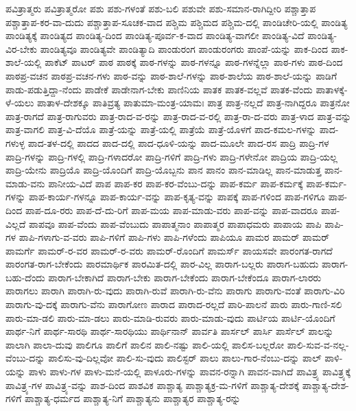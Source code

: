 {ಪವಿತ್ರಾತ್ಮರು
ಪವಿತ್ರಾತ್ಮರೋ
ಪಶು
ಪಶು-ಗಳಂತೆ
ಪಶು-ಬಲಿ
ಪಶುವೇ
ಪಶು-ಸಮಾನ-ರಾಗಿದ್ದೀರಿ
ಪಶ್ಚಾತ್ತಾಪ
ಪಶ್ಚಾತ್ತಾಪ-ಕರ-ವಾ-ದುದು
ಪಶ್ಚಾತ್ತಾಪ-ಸೂಚಕ-ವಾದ
ಪಶ್ಚಿಮ
ಪಶ್ಚಿಮದ
ಪಶ್ಚಿಮ-ದಲ್ಲಿ
ಪಾಂಡಿಚೇರಿ-ಯಲ್ಲಿ
ಪಾಂಡಿತ್ಯ
ಪಾಂಡಿತ್ಯಕ್ಕೆ
ಪಾಂಡಿತ್ಯದ
ಪಾಂಡಿತ್ಯ-ದಿಂದ
ಪಾಂಡಿತ್ಯ-ಪೂರ್ವ-ಕ-ವಾದ
ಪಾಂಡಿತ್ಯ-ವಾಗಲೀ
ಪಾಂಡಿತ್ಯ-ವಿದೆ
ಪಾಂಡಿತ್ಯ-ವಿರ-ಬೇಕು
ಪಾಂಡಿತ್ಯವೂ
ಪಾಂಡಿತ್ಯವೇ
ಪಾಂಡಿತ್ಯಾದಿ
ಪಾಂಡುರಂಗ
ಪಾಂಡುರಂಗರು
ಪಾಂಪೆ-ಯನ್ನು
ಪಾಕ-ದಿಂದ
ಪಾಕ-ಶಾಲೆ-ಯಲ್ಲಿ
ಪಾಕೆಟ್
ಪಾಟರ್
ಪಾಠ
ಪಾಠಕ್ಕೆ
ಪಾಠ-ಗಳನ್ನು
ಪಾಠ-ಗಳನ್ನೂ
ಪಾಠ-ಗಳನ್ನೆಲ್ಲಾ
ಪಾಠ-ಗಳು
ಪಾಠ-ದಿಂದ
ಪಾಠಪ್ರ-ವಚನ
ಪಾಠಪ್ರ-ವಚನ-ಗಳು
ಪಾಠ-ವನ್ನು
ಪಾಠ-ಶಾಲೆ-ಗಳನ್ನು
ಪಾಠ-ಶಾಲೆಯ
ಪಾಠ-ಶಾಲೆ-ಯನ್ನು
ಪಾಡಿಗೆ
ಪಾಡು-ಪಡುತ್ತಿದ್ದಾ-ನೆಂದು
ಪಾಡೇಕೆ
ಪಾಡೇನಾಗ-ಬೇಕು
ಪಾಣಿನಿಯ
ಪಾತಕ
ಪಾತಕ-ವಲ್ಲವೆ
ಪಾತಕ-ವೆಂದು
ಪಾತಾಳಕ್ಕೆ-ಳೆ-ಯಲು
ಪಾತಾಳ-ದೇಶಕ್ಕೂ
ಪಾತಿವ್ರತ್ಯ
ಪಾತುಮಾ-ಮಂತ್ರ-ಯಾಮಃ
ಪಾತ್ರ
ಪಾತ್ರ-ನಲ್ಲದೆ
ಪಾತ್ರ-ನಾಗಿದ್ದರೂ
ಪಾತ್ರನೋ
ಪಾತ್ರ-ರಾಗದೆ
ಪಾತ್ರ-ರಾಗುವರು
ಪಾತ್ರ-ರಾದ-ವ-ರನ್ನು
ಪಾತ್ರ-ರಾದ-ವ-ರಲ್ಲಿ
ಪಾತ್ರ-ರಾ-ದ-ವರು
ಪಾತ್ರ-ಳಾದ
ಪಾತ್ರ-ವನ್ನು
ಪಾತ್ರ-ವಾಗಲಿ
ಪಾತ್ರ-ವಿ-ದೆಯೊ
ಪಾತ್ರೆ-ಯನ್ನು
ಪಾತ್ರೆ-ಯಲ್ಲಿ
ಪಾತ್ರೆಯೆ
ಪಾತ್ರೆ-ಯೊಳಗೆ
ಪಾದ-ಕಮಲ-ಗಳನ್ನು
ಪಾದ-ಗಳುಳ್ಳ
ಪಾದ-ತಳ-ದಲ್ಲಿ
ಪಾದದ
ಪಾದ-ದಲ್ಲಿ
ಪಾದ-ಧೂಳಿ-ಯನ್ನು
ಪಾದ-ಮೂಲೇ
ಪಾದ-ರಸ
ಪಾದ್ರಿ
ಪಾದ್ರಿ-ಗಳ
ಪಾದ್ರಿ-ಗಳನ್ನು
ಪಾದ್ರಿ-ಗಳಲ್ಲಿ
ಪಾದ್ರಿ-ಗಳಾದರೋ
ಪಾದ್ರಿ-ಗಳಿಗೆ
ಪಾದ್ರಿ-ಗಳು
ಪಾದ್ರಿ-ಗಳೇನೋ
ಪಾದ್ರಿಯ
ಪಾದ್ರಿ-ಯಲ್ಲ
ಪಾದ್ರಿ-ಯೇನು
ಪಾದ್ರಿಯೊ
ಪಾದ್ರಿ-ಯೊಂದಿಗೆ
ಪಾದ್ರಿ-ಯೊಬ್ಬನು
ಪಾನ
ಪಾನಂ
ಪಾನ-ಮಾಡಿಲ್ಲ
ಪಾನ-ಮಾಡುತ್ತ
ಪಾನ-ಮಾಡು-ವನು
ಪಾನೀಯ-ವಿದೆ
ಪಾಪ
ಪಾಪ-ಕರ
ಪಾಪ-ಕರ-ವೆಂಬು-ದನ್ನು
ಪಾಪ-ಕರ್ಮ
ಪಾಪ-ಕರ್ಮಕ್ಕೆ
ಪಾಪ-ಕರ್ಮ-ಗಳನ್ನು
ಪಾಪ-ಕಾರ್ಯ-ಗಳನ್ನೂ
ಪಾಪ-ಕಾರ್ಯ-ವನ್ನು
ಪಾಪ-ಕೃತ್ಯ-ವನ್ನು
ಪಾಪಕ್ಕೆ
ಪಾಪ-ಗಳಿಂದ
ಪಾಪ-ಗಳಿಗೂ
ಪಾಪ-ದಿಂದ
ಪಾಪ-ದೂ-ರರು
ಪಾಪ-ದೆ-ದು-ರಿಗೆ
ಪಾಪ-ಮಯ
ಪಾಪ-ಮಾಡು-ವರು
ಪಾಪ-ವನ್ನು
ಪಾಪ-ವಾದರೂ
ಪಾಪ-ವಿಲ್ಲದೆ
ಪಾಪವೂ
ಪಾಪ-ವೆಂದು
ಪಾಪ-ವೆಂಬುದು
ಪಾಪಾತ್ಮನಾಂ
ಪಾಪಾತ್ಮರ
ಪಾಪಾಧಮರು
ಪಾಪಾಯ
ಪಾಪಿ
ಪಾಪಿ-ಗಳ
ಪಾಪಿ-ಗಳಾಗು-ವ-ವರು
ಪಾಪಿ-ಗಳಿಗೆ
ಪಾಪಿ-ಗಳು
ಪಾಪಿ-ಗಳೆಂದು
ಪಾಪಿಯೂ
ಪಾಮರ
ಪಾಮರ್
ಪಾಮರ್
ಪಾಮರ್ಗೆ
ಪಾಮರ್-ರ-ವರ
ಪಾಮರ್-ರ-ವರು
ಪಾಮರ್-ರೊಂದಿಗೆ
ಪಾಮರ್ಸ್
ಪಾಯಸವೇ
ಪಾರಂಗತ-ರಾಗದೆ
ಪಾರಂಗತ-ರಾಗ-ಬೇಕೆಂದು
ಪಾರಮಾರ್ಥಿಕ
ಪಾರಮಿತ-ದಲ್ಲಿ
ಪಾರ-ವಿಲ್ಲ
ಪಾರಾಗ-ಬಲ್ಲರು
ಪಾರಾಗ-ಬಹುದು
ಪಾರಾಗ-ಬಹು-ದೆಂದು
ಪಾರಾಗ-ಬೇಕಾಗಿದೆ
ಪಾರಾಗ-ಬೇಕು
ಪಾರಾಗ-ಬೇಕೆಂದು
ಪಾರಾಗ-ಬೇಕೆಂದೂ
ಪಾರಾಗ-ಲಾರರು
ಪಾರಾಗಲು
ಪಾರಾಗಿ
ಪಾರಾಗಿ-ರು-ವುದು
ಪಾರಾಗಿ-ರುವೆ
ಪಾರಾಗಿ-ರು-ವೆನು
ಪಾರಾಗು
ಪಾರಾಗು-ವಂತೆ
ಪಾರಾಗು-ವಿರಿ
ಪಾರಾಗು-ವು-ದಕ್ಕೆ
ಪಾರಾಗು-ವೆನು
ಪಾರಾಗೋಣ
ಪಾರಾದ
ಪಾರಾದ-ರಲ್ಲದೆ
ಪಾರಿ-ಪಾಲನೆ
ಪಾರು
ಪಾರು-ಗಾಣಿ-ಸಲಿ
ಪಾರು-ಮಾ-ಡಲಿ
ಪಾರು-ಮಾ-ಡಲು
ಪಾರು-ಮಾಡಿ-ರುವರು
ಪಾರು-ಮಾಡು-ವುದು
ಪಾರ್ಟಿಯ
ಪಾರ್ಟಿ-ಯೊಂದಿಗೆ
ಪಾರ್ಥ-ನಿಗೆ
ಪಾರ್ಥ-ಸಾರಥಿ
ಪಾರ್ಥ-ಸಾರಥಿಯು
ಪಾರ್ಥಿನಾನ್
ಪಾರ್ವತಿ
ಪಾರ್ಸಲ್
ಪಾರ್ಸಿ
ಪಾರ್ಸೆಲ್
ಪಾಲನ್ನು
ಪಾಲಾಗಿ
ಪಾಲಾ-ದುವು
ಪಾಲಿಗೂ
ಪಾಲಿಗೆ
ಪಾಲಿನ
ಪಾಲಿ-ನಷ್ಟು
ಪಾಲಿ-ಯಲ್ಲಿ
ಪಾಲಿಸ-ಬಲ್ಲರೋ
ಪಾಲಿ-ಸುವ-ವ-ನಲ್ಲ-ವೆಂಬು-ದನ್ನು
ಪಾಲಿಸು-ವು-ದಿಲ್ಲವೋ
ಪಾಲಿ-ಸು-ವುದು
ಪಾಲಿಸ್ಟರ್
ಪಾಲು
ಪಾಲು-ಗಾರ-ನೆಂಬು-ದನ್ನು
ಪಾಲ್
ಪಾಳಿ-ಯನ್ನು
ಪಾಳು
ಪಾಳು-ಗಳ
ಪಾಳು-ಮನೆ-ಯಲ್ಲಿ
ಪಾಳೂರು-ಗಳನ್ನು
ಪಾವನ-ರನ್ನಾಗಿ
ಪಾವನ-ವಾಗಿದೆ
ಪಾವಿತ್ರ್ಯ
ಪಾವಿತ್ರ್ಯಕ್ಕೆ
ಪಾವಿತ್ರ್ಯ-ಗಳ
ಪಾವಿತ್ರ್ಯ-ವನ್ನು
ಪಾಶ-ದಿಂದ
ಪಾಶವಿಕ
ಪಾಶ್ಚಾತ್ಯ
ಪಾಶ್ಚಾತ್ಯಕ್ರ-ಮ-ಗಳಿಗೆ
ಪಾಶ್ಚಾತ್ಯ-ದೇಶಕ್ಕೆ
ಪಾಶ್ಚಾತ್ಯ-ದೇಶ-ಗಳಿಗೆ
ಪಾಶ್ಚಾತ್ಯ-ಧರ್ಮದ
ಪಾಶ್ಚಾತ್ಯ-ನಿಗೆ
ಪಾಶ್ಚಾತ್ಯನು
ಪಾಶ್ಚಾತ್ಯರ
ಪಾಶ್ಚಾತ್ಯ-ರನ್ನು
}
